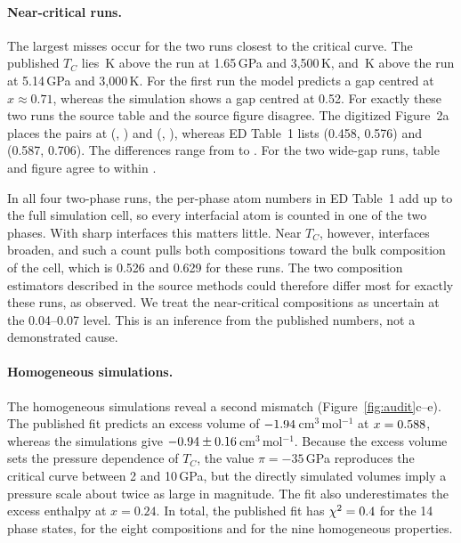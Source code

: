 \paragraph{Near-critical runs.} The largest misses occur for the two runs closest to the
critical curve. The published $T_C$ lies \tcAboveRunNearCritLow{}\,K above the run at
1.65\,GPa and 3,500\,K, and \tcAboveRunNearCritHigh{}\,K above the run at 5.14\,GPa and
3,000\,K. For the first run the model predicts a gap centred at $x \approx 0.71$, whereas the
simulation shows a gap centred at 0.52. For exactly these two runs the source table and the
source figure disagree. The digitized Figure~2a places the pairs at
(\figLoOneSixFive{}, \figHiOneSixFive{}) and (\figLoFiveOneFour{}, \figHiFiveOneFour{}),
whereas ED Table~1 lists (0.458, 0.576) and (0.587, 0.706). The differences range from
\diffLoFiveOneFour{} to \diffHiOneSixFive{}. For the two wide-gap runs, table and figure agree
to within \digMarker{}.

In all four two-phase runs, the per-phase atom numbers in ED Table~1 add up to the full
simulation cell, so every interfacial atom is counted in one of the two phases. With sharp
interfaces this matters little. Near $T_C$, however, interfaces broaden, and such a count
pulls both compositions toward the bulk composition of the cell, which is 0.526 and 0.629 for
these runs. The two composition estimators described in the source methods
\cite{gilmore2026} could therefore differ most for exactly these runs, as observed. We treat
the near-critical compositions as uncertain at the 0.04--0.07 level. This is an inference from
the published numbers, not a demonstrated cause.

\paragraph{Homogeneous simulations.} The homogeneous simulations reveal a second mismatch
(Figure~\ref{fig:audit}c--e). The published fit predicts an excess volume of
$-1.94$\,cm$^3$\,mol$^{-1}$ at $x = 0.588{}$, whereas the simulations give
$-0.94 \pm 0.16$\,cm$^3$\,mol$^{-1}$. Because the excess volume sets the pressure dependence of $T_C$,
the value $\pi = -35$\,GPa reproduces the critical curve between 2 and 10\,GPa, but the
directly simulated volumes imply a pressure scale about twice as large in magnitude. The fit
also underestimates the excess enthalpy at $x = 0.24$. In total, the published fit has
$\chi^2 = 0.4{}$ for the 14 phase states, \pubChiComp{} for the eight compositions
and \pubChiHom{} for the nine homogeneous properties.

